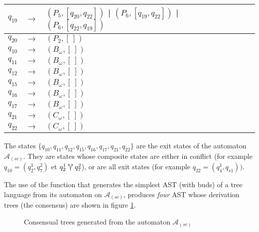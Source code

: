 \begin{table}[ht]
\begin{tabular}[t]{|lcp{5.7cm}|lcp{5cm}|}
	\hline
	
	$q_{19}$ & $\longrightarrow$ & $(P_{5}, [q_{20}, q_{22}])$ | $(P_{6}, [q_{19}, q_{22}])$ | $(P_{6}, [q_{22}, q_{19}])$ & & &\\
	\hline
	
	$q_{20}$ & $\longrightarrow$ & $(P_{2}, [\,])$ & & &\\
	\hline
	
	$q_{10}$ & $\longrightarrow$ & $(B_\omega, [\,])$ & & &\\ 
	\hline
	$q_{11}$ & $\longrightarrow$ & $(B_\omega, [\,])$ & & &\\
	\hline
	$q_{12}$ & $\longrightarrow$ & $(B_\omega, [\,])$ & & &\\
	\hline
	$q_{15}$ & $\longrightarrow$ & $(B_\omega, [\,])$ & & &\\
	\hline
	$q_{16}$ & $\longrightarrow$ & $(B_\omega, [\,])$ & & &\\
	\hline
	$q_{17}$ & $\longrightarrow$ & $(B_\omega, [\,])$ & & &\\
	\hline
	$q_{21}$ & $\longrightarrow$ & $(C_\omega, [\,])$ & & &\\
	\hline
	$q_{22}$ & $\longrightarrow$ & $(C_\omega, [\,])$ & & &\\
	\hline
	\end{tabular}
\end{table}


The states $\{q_{10}, q_{11}, q_{12}, q_{15}, q_{16}, q_{17}, q_{21}, q_{22}\}$ are the exit states of the automaton $\mathcal{A}_{(sc)}$. They are states whose composite states are either in conflict (for example $q_{10}=(q_{2}^{1}, q_{7}^{2})$ et $q_{2}^{1} \curlyveeuparrow q_{7}^{2}$), or are all exit states (for example $q_{22}=(q_{4}^{1}, q_{s1}))$.

The use of the function that generates the simplest AST (with buds) of a tree language from its automaton \cite{badouelTchoupeCmcs} on $\mathcal{A}_{(sc)}$, produces \textit{four} AST whose derivation trees (the consensus) are shown in figure \ref{chap2:fig:consensus-example-trees}.
\begin{figure}[ht!]
	\noindent
	\caption{Consensual trees generated from the automaton $\mathcal{A}_{(sc)}$}
	\label{chap2:fig:consensus-example-trees}
\end{figure}

